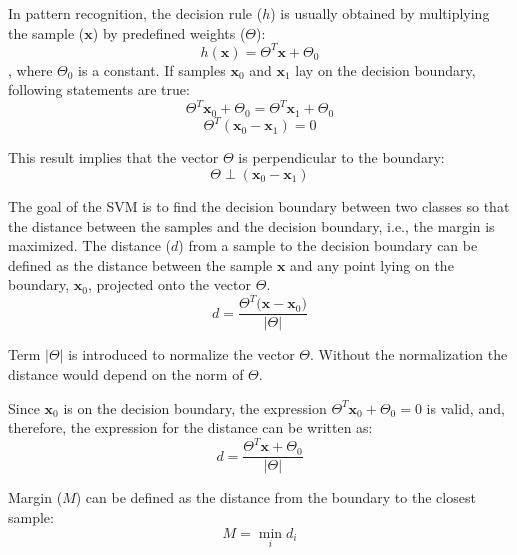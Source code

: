 
In pattern recognition, the decision rule ($h$) is usually obtained by multiplying the sample ($\mathbf{x}$) by predefined weights ($\Theta$):
\begin{equation} 
h(\mathbf{x}) = \Theta^T \mathbf{x} + \Theta_0
\end{equation}
\noindent , where $\Theta_0$ is a constant. If samples $\mathbf{x}_0$ and $\mathbf{x}_1$ lay on the decision boundary, following statements are true:
\begin{equation} 
\Theta^T \mathbf{x}_0 + \Theta_0 = \Theta^T \mathbf{x}_1 + \Theta_0
\end{equation}
\begin{equation} 
\Theta^T (\mathbf{x}_0 - \mathbf{x}_1) = 0
\end{equation}

\noindent This result implies that the vector $\Theta$ is perpendicular to the boundary:
\begin{equation} 
\Theta \perp \left(\mathbf{x}_0 - \mathbf{x}_1\right)
\end{equation}


The goal of the SVM is to find the decision boundary between two classes so that the distance between the samples and the decision boundary, i.e., the margin is maximized. The distance ($d$) from a sample to the decision boundary can be defined as the distance between the sample $\mathbf{x}$ and any point lying on the boundary, $\mathbf{x}_0$, projected onto the vector $\Theta$.
\begin{equation} 
d = \frac{\Theta^T \big(\mathbf{x} - \mathbf{x}_0\big)}{\big\vert \Theta \big\vert}
\end{equation}

\noindent Term $\vert \Theta \vert$ is introduced to normalize the vector $\Theta$. Without the normalization the distance would depend on the norm of $\Theta$.

Since $\mathbf{x}_0$ is on the decision boundary, the expression $\Theta^T \mathbf{x}_0 + \Theta_0 = 0$ is valid, and, therefore, the expression for the distance can be written as:
\begin{equation} 
d = \frac{\Theta^T \mathbf{x} + \Theta_0}{\big\vert \Theta \big\vert}
\end{equation}

Margin ($M$) can be defined as the distance from the boundary to the closest sample:
\begin{equation} 
M = \min_i d_i
\end{equation}

